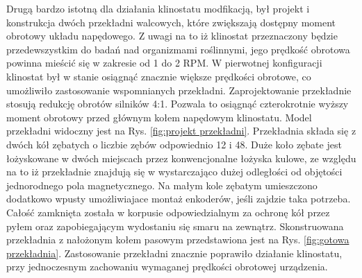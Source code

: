Drugą bardzo istotną dla działania klinostatu modfikacją, był projekt i konstrukcja dwóch
 przekładni walcowych, które zwiększają dostępny moment obrotowy układu napędowego. Z uwagi na
  to iż klinostat przeznaczony będzie przedewszystkim do badań nad organizmami roślinnymi, jego
   prędkość obrotowa powinna mieścić się w zakresie od 1 do 2 RPM. W pierwotnej konfiguracji
    klinostat był \linebreak w stanie osiągnąć znacznie większe prędkości obrotowe, co umożliwiło
     zastosowanie wspomnianych przekładni. Zaprojektowanie przekładnie stosują redukcję obrotów
      silników 4:1. Pozwala to osiągnąć czterokrotnie wyższy moment obrotowy przed głównym kołem
       napędowym klinostatu. Model przekładni widoczny jest na Rys. \ref{fig:projekt
       	 przekładni}. Przekładnia składa się z dwóch kół zębatych o liczbie zębów odpowiednio 12 i 48. Duże koło zębate jest
          łożyskowane w dwóch miejscach przez konwencjonalne łożyska kulowe, ze względu na to iż przekładnie znajdują się w wystarczająco dużej odległości od objętości jednorodnego
            pola magnetycznego. Na małym kole zębatym umieszczono dodatkowo wpusty umożliwiajace
             montaż enkoderów, jeśli zajdzie taka potrzeba. Całość zamknięta została w korpusie
              odpowiedzialnym \linebreak za ochronę kół przez pyłem oraz zapobiegającym wydostaniu się
               smaru na zewnątrz. Skonstruowana przekładnia z nałożonym kołem pasowym
                przedstawiona jest na Rys. \ref{fig:gotowa przekładnia}. Zastosowanie przekładni
                 znacznie poprawiło działanie klinostatu, przy jednoczesnym zachowaniu wymaganej
                  prędkości obrotowej urządzenia.       


